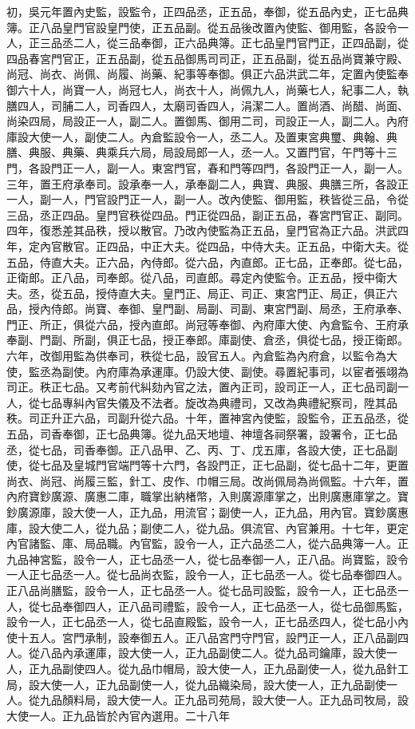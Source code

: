 初，吳元年置內史監，設監令，正四品丞，正五品，奉御，從五品內史，正七品典簿。正八品皇門官設皇門使，正五品副。從五品後改置內使監、御用監，各設令一人，正三品丞二人，從三品奉御，正六品典簿。正七品皇門官門正，正四品副，從四品春宮門官正，正五品副，從五品御馬司司正，正五品副，從五品尚寶兼守殿、尚冠、尚衣、尚佩、尚履、尚藥、紀事等奉御。俱正六品洪武二年，定置內使監奉御六十人，尚寶一人，尚冠七人，尚衣十人，尚佩九人，尚藥七人，紀事二人，執膳四人，司脯二人，司香四人，太廟司香四人，涓潔二人。置尚酒、尚醋、尚面、尚染四局，局設正一人，副二人。置御馬、御用二司，司設正一人，副二人。內府庫設大使一人，副使二人。內倉監設令一人，丞二人。及置東宮典璽、典翰、典膳、典服、典藥、典乘兵六局，局設局郎一人，丞一人。又置門官，午門等十三門，各設門正一人，副一人。東宮門官，春和門等四門，各設門正一人，副一人。三年，置王府承奉司。設承奉一人，承奉副二人，典寶、典服、典膳三所，各設正一人，副一人，門官設門正一人，副一人。改內使監、御用監，秩皆從三品，令從三品，丞正四品。皇門官秩從四品。門正從四品，副正五品，春宮門官正、副同。四年，復悉差其品秩，授以散官。乃改內使監為正五品，皇門官為正六品。洪武四年，定內官散官。正四品，中正大夫。從四品，中侍大夫。正五品，中衛大夫。從五品，侍直大夫。正六品，內侍郎。從六品，內直郎。正七品，正奉郎。從七品，正衛郎。正八品，司奉郎。從八品，司直郎。尋定內使監令。正五品，授中衛大夫。丞，從五品，授侍直大夫。皇門正、局正、司正、東宮門正、局正，俱正六品，授內侍郎。尚寶、奉御、皇門副、局副、司副、東宮門副、局丞，王府承奉、門正、所正，俱從六品，授內直郎。尚冠等奉御、內府庫大使、內倉監令、王府承奉副、門副、所副，俱正七品，授正奉郎。庫副使、倉丞，俱從七品，授正衛郎。六年，改御用監為供奉司，秩從七品，設官五人。內倉監為內府倉，以監令為大使，監丞為副使。內府庫為承運庫。仍設大使、副使。尋置紀事司，以宦者張翊為司正。秩正七品。又考前代糾劾內官之法，置內正司，設司正一人，正七品司副一人，從七品專糾內官失儀及不法者。旋改為典禮司，又改為典禮紀察司，陞其品秩。司正升正六品，司副升從六品。十年，置神宮內使監，設監令，正五品丞，從五品，司香奉御，正七品典簿。從九品天地壇、神壇各祠祭署，設署令，正七品丞，從七品，司香奉御。正八品甲、乙、丙、丁、戊五庫，各設大使，正七品副使，從七品及皇城門官端門等十六門，各設門正，正七品副，從七品十二年，更置尚衣、尚冠、尚履三監，針工、皮作、巾帽三局。改尚佩局為尚佩監。十六年，置內府寶鈔廣源、廣惠二庫，職掌出納楮幣，入則廣源庫掌之，出則廣惠庫掌之。寶鈔廣源庫，設大使一人，正九品，用流官；副使一人，正九品，用內官。寶鈔廣惠庫，設大使二人，從九品；副使二人，從九品。俱流官、內官兼用。十七年，更定內官諸監、庫、局品職。內官監，設令一人，正六品丞二人，從六品典簿一人。正九品神宮監，設令一人，正七品丞一人，從七品奉御一人，正八品。尚寶監，設令一人正七品丞一人。從七品尚衣監，設令一人，正七品丞一人。從七品奉御四人。正八品尚膳監，設令一人，正七品丞一人。從七品司設監，設令一人，正七品丞一人，從七品奉御四人，正八品司禮監，設令一人，正七品丞一人，從七品御馬監，設令一人，正七品丞一人，從七品直殿監，設令一人，正七品丞四人，從七品小內使十五人。宮門承制，設奉御五人。正八品宮門守門官，設門正一人，正八品副四人。從八品內承運庫，設大使一人，正九品副使二人。從九品司鑰庫，設大使一人，正九品副使四人。從九品巾帽局，設大使一人，正九品副使一人，從九品針工局，設大使一人，正九品副使一人，從九品織染局，設大使一人，正九品副使一人。從九品顏料局，設大使一人。正九品司苑局，設大使一人。正九品司牧局，設大使一人。正九品皆於內官內選用。二十八年
